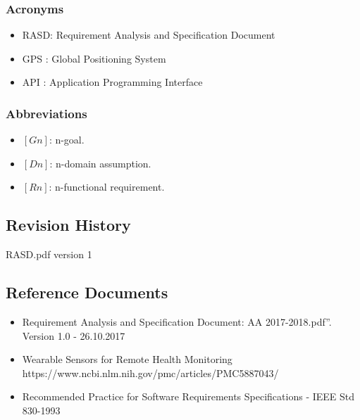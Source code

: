 \documentclass[12pt]{article}
\begin{document}
\subsubsection{Acronyms}
\begin{itemize}
\item{} RASD: Requirement Analysis and Specification Document
\item{} GPS : Global Positioning System
\item{} API : Application Programming Interface

\end{itemize}

\subsubsection{Abbreviations}
\begin{itemize}
\item $[Gn]$: n-goal. 
\item $[Dn]$: n-domain assumption. 
\item $[Rn]$: n-functional requirement. 

\end{itemize}
\subsection{Revision History}
RASD.pdf version 1
\subsection{Reference Documents}
\begin{itemize}
\item Requirement Analysis and Specification Document: AA 2017-2018.pdf”. Version 1.0 - 26.10.2017
\item Wearable Sensors for Remote Health Monitoring
\\https://www.ncbi.nlm.nih.gov/pmc/articles/PMC5887043/
\item Recommended Practice for Software Requirements Specifications - IEEE Std 830-1993


\end{itemize}
\end{document}
